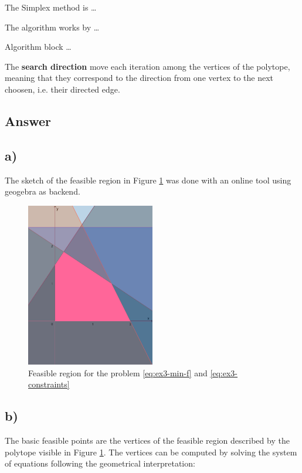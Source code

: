 \documentclass[unicode,11pt,a4paper,oneside,numbers=endperiod,openany, draft]{scrartcl}
\begin{document}
The Simplex method is \dots

The algorithm works by \dots

Algorithm block \dots

The \textbf{search direction} move each iteration among the vertices of the polytope,
meaning that they correspond to the direction from one vertex to the next choosen, 
i.e. their directed edge. 

\subsection{Answer}

\subsection*{a)}

The sketch of the feasible region in Figure \ref{fig:feasible-region}
was done with an online tool using geogebra as backend.

\begin{figure}[htbp]
    \centering
    \includegraphics[width=0.5\textwidth]{./figures/ex3-feasible-region.png}
    \caption{Feasible region for the problem \ref{eq:ex3-min-f} and \ref{eq:ex3-constraints}}
    \label{fig:feasible-region}
\end{figure}

\subsection*{b)}

The basic feasible points are the vertices of the feasible region described by the polytope
visible in Figure \ref{fig:feasible-region}.
The vertices can be computed by solving the system of equations
following the geometrical interpretation:
\end{document}
